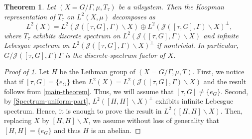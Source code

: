 \documentclass[10pt,a4paper]{amsart}
\newtheorem{theorem}{Theorem}
\begin{document}
\begin{theorem}\label{Theo-B}
Let $(X=G/\Gamma,\mu,T_{\tau})$ be a nilsystem. Then the Koopman representation of $T_{\tau}$ on $L^2(X,\mu)$ decomposes as
  $$ L^2(X)=L^2(\mathcal{J}([\tau,G],\Gamma)\backslash X)\oplus L^2(\mathcal{J}([\tau,G],\Gamma)\backslash X)^\perp,$$
  where $T_{\tau}$ exhibits discrete spectrum on $L^2(\mathcal{J}([\tau,G],\Gamma)\backslash X)$ and infinite Lebesgue spectrum on $L^2(\mathcal{J}([\tau,G],\Gamma)\backslash X)^\perp$ if nontrivial. In particular, $G/\mathcal{J}([\tau,G],\Gamma)\Gamma$ is the discrete-spectrum factor of $X$.
\end{theorem}

\begin{proof}[Proof of \cref{Theo-B}]
Let $H$ be the Leibman group of $(X=G/\Gamma,\mu,T)$. First, we notice that if $[\tau,G]=\{e_G\}$ then $L^2(X)=L^2(\mathcal{J}([\tau,G],\Gamma)\backslash X)$ and the result follows from \cref{main-theorem}. Thus, we will assume that $[\tau,G]\neq \{e_G\}$. Second, by \cref{Spectrum-uniform-part}, $L^2([H,H]\backslash X)^\perp$ exhibits infinite Lebesgue spectrum. Hence, it is enough to prove the result in $L^2([H,H]\backslash X)$. Then, replacing $X$ by $[H,H]\backslash X$, we assume without loss of generality that $[H,H]=\{e_G\}$ and thus $H$ is an abelian.



\end{proof}
\end{document}
